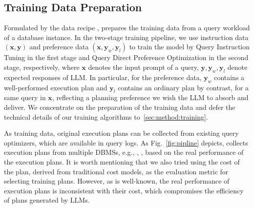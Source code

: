 \subsection{Training Data Preparation}
\label{sec:queryinstruct:PDG}
Formulated by the data recipe \QueryInstruct, \LLMQO prepares the training data from a query workload of a database instance. 
In the two-stage training pipeline, 
we use instruction data $(\bm{x}, \bm{y})$ and preference data $(\bm{x}, \bm{y}_{w}, \bm{y}_{l})$ to train the model by Query Instruction Tuning in the first stage and Query Direct Preference Optimization in the second stage, respectively, where $\bm{x}$ denotes the input prompt of a query, 
$\bm{y}, \bm{y}_{w}, \bm{y}_{l}$ denote expected responses of LLM. 
In particular, for the preference data, $\bm{y}_{w}$ contains a well-performed execution plan and $\bm{y}_{l}$ contains an ordinary plan by contrast, for a same query in $\bm{x}$, reflecting a planning preference we wish the LLM to absorb and deliver. 
We concentrate on the preparation of the training data and defer the technical details of our training algorithms to~\cref{sec:method:training}.


 As training data, original execution plans can be collected from existing query optimizers, which are available in query logs. As Fig.~\ref{fig:pipline} depicts, \LLMQO collects execution plans from multiple DBMSs, e.g., \Postgres, \Oracle, based on the real performance of the execution plans. 
It is worth mentioning that we also tried using the cost of the plan, derived from traditional cost models, as the evaluation metric for selecting training plans. However, as is well-known, the real performance of execution plans is inconsistent with their cost, which compromises the efficiency of plans generated by LLMs.

